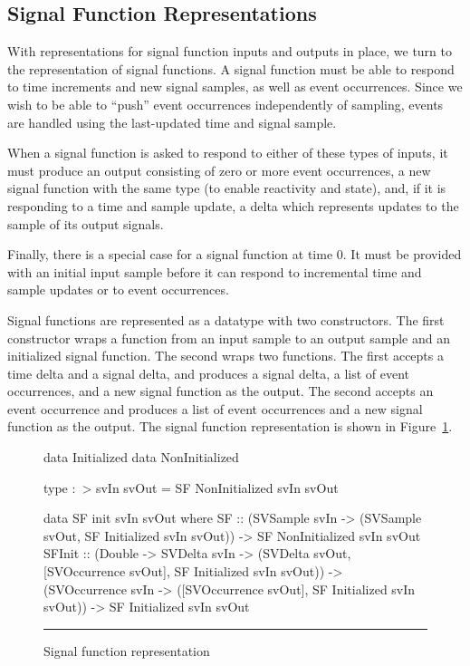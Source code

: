 \documentclass[draft]{llncs}
\begin{document}
\subsection{Signal Function Representations}
\label{subsection:Signal_Function_Representations}
With representations for signal function inputs and outputs in place, we turn
to the representation of signal functions. A signal function must be able to
respond to time increments and new signal samples, as well as event occurrences.
Since we wish to be able to ``push'' event occurrences independently of
sampling, events are handled using the last-updated time and signal sample.

When a signal function is asked to respond to either of these types of inputs,
it must produce an output consisting of zero or more event occurrences, a new
signal function with the same type (to enable reactivity and state), and, if
it is responding to a time and sample update, a delta which represents updates
to the sample of its output signals.

Finally, there is a special case for a signal function at time 0. It must be
provided with an initial input sample before it can respond to incremental time
and sample updates or to event occurrences.

Signal functions are represented as a datatype with two constructors. The first
constructor wraps a function from an input sample to an output sample and an
initialized signal function. The second wraps two functions. The first accepts
a time delta and a signal delta, and produces a signal delta, a list of event
occurrences, and a new signal function as the output. The second accepts an
event occurrence and produces a list of event occurrences and a new signal
function as the output. The signal function representation is shown in Figure~\ref{figure:signal_function_representation}.

\begin{figure}[t]
\begin{code}
data Initialized
data NonInitialized

type :~> svIn svOut = SF NonInitialized svIn svOut

data SF init svIn svOut where
  SF :: (SVSample svIn -> (SVSample svOut, SF Initialized svIn svOut))
        -> SF NonInitialized svIn svOut
  SFInit :: (Double -> SVDelta svIn 
             -> (SVDelta svOut, [SVOccurrence svOut],
                 SF Initialized svIn svOut))
            -> (SVOccurrence svIn -> ([SVOccurrence svOut],
                                      SF Initialized svIn svOut))
            -> SF Initialized svIn svOut
\end{code}
\hrule
\caption{Signal function representation}
\label{figure:signal_function_representation}
\end{figure}
\end{document}
